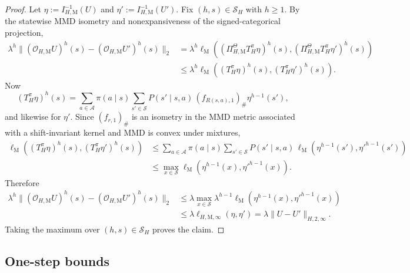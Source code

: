 \documentclass{article}
\newcommand{\X}{\mathcal{S}}
\newcommand{\A}{\mathcal{A}}
\begin{document}
\begin{proof}
Let $\eta:=I_{H,\mathrm M}^{-1}(U)$ and $\eta':=I_{H,\mathrm M}^{-1}(U')$. Fix $(h,s)\in\mathcal S_H$ with $h \ge 1$. By the statewise MMD isometry and nonexpansiveness of the signed-categorical projection,
\begin{equation}
\begin{aligned}
\lambda^h \lVert (\mathcal O_{H,\mathrm M}U)^h(s)-(\mathcal O_{H,\mathrm M}U')^h(s) \rVert_2 &= \lambda^h \ell_{\mathrm M}\left( (\Pi_{H,\mathrm M}^{\Theta}T_H^\pi\eta)^h(s), (\Pi_{H,\mathrm M}^{\Theta}T_H^\pi\eta')^h(s) \right) \\ 
&\le \lambda^h \ell_{\mathrm M}\left( (T_H^\pi\eta)^h(s), (T_H^\pi\eta')^h(s) \right).
\end{aligned}
\end{equation}
Now
\begin{equation}
(T_H^\pi\eta)^h(s) = \sum_{a\in\A}\pi(a \mid s)\sum_{s'\in\X}P(s' \mid s,a)\, (f_{R(s,a),1})_\#\eta^{h-1}(s'),
\end{equation}
and likewise for $\eta'$. Since $(f_{r,1})_\#$ is an isometry in the MMD metric associated with a shift-invariant kernel and MMD is convex under mixtures,
\begin{equation}
\begin{aligned}
\ell_{\mathrm M}\left( (T_H^\pi\eta)^h(s), (T_H^\pi\eta')^h(s) \right) &\le \sum_{a\in\A}\pi(a \mid s)\sum_{s'\in\X}P(s' \mid s,a)\, \ell_{\mathrm M}\left(\eta^{h-1}(s'),{\eta'}^{h-1}(s')\right) \\ 
&\le \max_{x\in\X} \ell_{\mathrm M}\left(\eta^{h-1}(x),{\eta'}^{h-1}(x)\right).
\end{aligned}
\end{equation}
Therefore
\begin{equation}
\begin{aligned}
\lambda^h \lVert (\mathcal O_{H,\mathrm M}U)^h(s)-(\mathcal O_{H,\mathrm M}U')^h(s) \rVert_2 &\le \lambda \max_{x\in\X} \lambda^{h-1} \ell_{\mathrm M}\left(\eta^{h-1}(x),{\eta'}^{h-1}(x)\right) \\ 
&\le \lambda \ell_{H,\mathrm M,\infty}(\eta,\eta') = \lambda \lVert U-U'\rVert_{H,2,\infty}.
\end{aligned}
\end{equation}
Taking the maximum over $(h,s)\in\mathcal S_H$ proves the claim.
\end{proof}

\subsection{One-step bounds}
\end{document}
